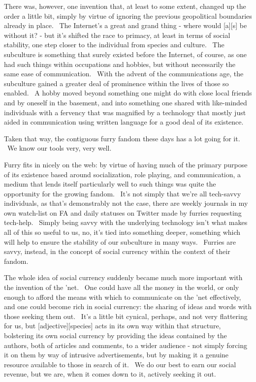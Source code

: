 There was, however, one invention that, at least to some extent, changed
up the order a little bit, simply by virtue of ignoring the previous
geopolitical boundaries already in place. ~The Internet's a great and
grand thing - where would {[}a{]}{[}s{]} be without it? - but it's
shifted the race to primacy, at least in terms of social stability, one
step closer to the individual from species and culture. ~The subculture
is something that surely existed before the Internet, of course, as one
had such things within occupations and hobbies, but without necessarily
the same ease of communication. ~With the advent of the communications
age, the subculture gained a greater deal of prominence within the lives
of those so enabled. ~A hobby moved beyond something one might do with
close local friends and by oneself in the basement, and into something
one shared with like-minded individuals with a fervency that was
magnified by a technology that mostly just aided in communication using
written language for a good deal of its existence.

Taken that way, the contiguous furry fandom these days has a lot going
for it. ~We know our tools very, very well.

Furry fits in nicely on the web: by virtue of having much of the primary
purpose of its existence based around socialization, role playing, and
communication, a medium that lends itself particularly well to such
things was quite the opportunity for the growing fandom. ~It's not
simply that we're all tech-savvy individuals, as that's demonstrably not
the case, there are weekly journals in my own watch-list on FA and daily
statuses on Twitter made by furries requesting tech-help. ~Simply being
savvy with the underlying technology isn't what makes all of this so
useful to us, no, it's tied into something deeper, something which will
help to ensure the stability of our subculture in many ways. ~Furries
are savvy, instead, in the concept of social currency within the context
of their fandom.

The whole idea of social currency suddenly became much more important
with the invention of the 'net. ~One could have all the money in the
world, or only enough to afford the means with which to communicate on
the 'net effectively, and one could become rich in social currency: the
sharing of ideas and words with those seeking them out. ~It's a little
bit cynical, perhaps, and not very flattering for us, but
{[}adjective{]}{[}species{]} acts in its own way within that structure,
bolstering its own social currency by providing the ideas contained by
the authors, both of articles and comments, to a wider audience - not
simply forcing it on them by way of intrusive advertisements, but by
making it a genuine resource available to those in search of it. ~We do
our best to earn our social revenue, but we are, when it comes down to
it, actively seeking it out.

